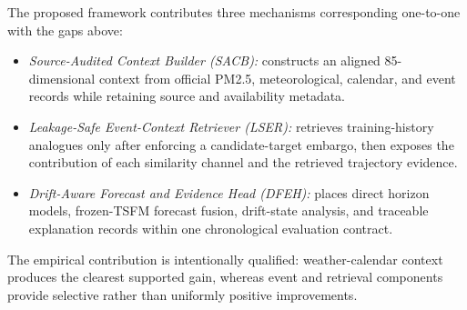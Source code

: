 The proposed framework contributes three mechanisms corresponding one-to-one
with the gaps above:
\begin{itemize}
    \item \textit{Source-Audited Context Builder (SACB):} constructs an aligned
    85-dimensional context from official PM2.5, meteorological, calendar, and
    event records while retaining source and availability metadata.
    \item \textit{Leakage-Safe Event-Context Retriever (LSER):} retrieves
    training-history analogues only after enforcing a candidate-target embargo,
    then exposes the contribution of each similarity channel and the retrieved
    trajectory evidence.
    \item \textit{Drift-Aware Forecast and Evidence Head (DFEH):} places direct
    horizon models, frozen-TSFM forecast fusion, drift-state analysis, and
    traceable explanation records within one chronological evaluation contract.
\end{itemize}

The empirical contribution is intentionally qualified: weather-calendar
context produces the clearest supported gain, whereas event and retrieval
components provide selective rather than uniformly positive improvements.
